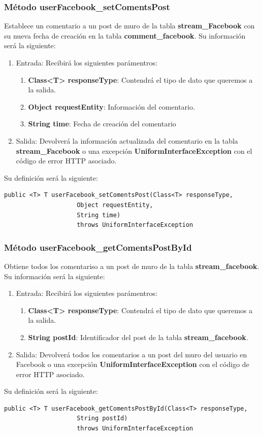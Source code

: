 \subsubsection{Método userFacebook\_setComentsPost}
Establece un comentario a un post de muro de la tabla \textbf{stream\_Facebook} con su nueva fecha de creación en la tabla \textbf{comment\_facebook}. Su información será la siguiente:
\begin{enumerate}
\item Entrada: Recibirá los siguientes parámentros:
\begin{enumerate}
\item \textbf{Class<T> responseType}: Contendrá el tipo de dato que queremos a la salida. 
\item \textbf{Object requestEntity}: Información del comentario.
\item \textbf{String time}: Fecha de creación del comentario
\end{enumerate}
\item Salida: Devolverá la información actualizada del comentario en la tabla \textbf{stream\_Facebook} o una excepción \textbf{UniformInterfaceException} con el código de error HTTP asociado.
\end{enumerate}
\bigskip
\par
Su definición será la siguiente:
\begin{verbatim}public <T> T userFacebook_setComentsPost(Class<T> responseType, 
					Object requestEntity, 
					String time) 
					throws UniformInterfaceException\end{verbatim}


\subsubsection{Método userFacebook\_getComentsPostById}
Obtiene todos los comentariso a un post de muro de la tabla \textbf{stream\_facebook}. Su información será la siguiente:
\begin{enumerate}
\item Entrada: Recibirá los siguientes parámentros:
\begin{enumerate}
\item \textbf{Class<T> responseType}: Contendrá el tipo de dato que queremos a la salida.
\item \textbf{String postId}: Identificador del post de la tabla \textbf{stream\_facebook}.
\end{enumerate}
\item Salida: Devolverá todos los comentarios a un post del muro del usuario en Facebook o una excepción \textbf{UniformInterfaceException} con el código de error HTTP asociado.
\end{enumerate}
\bigskip
\par
Su definición será la siguiente:
\begin{verbatim}public <T> T userFacebook_getComentsPostById(Class<T> responseType, 
					String postId) 
					throws UniformInterfaceException\end{verbatim}

